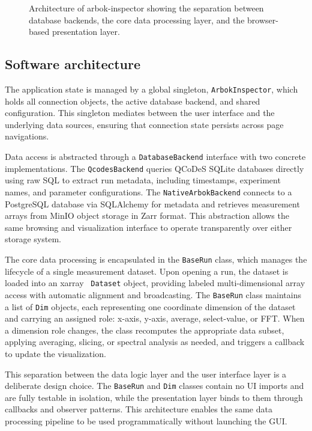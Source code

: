 \begin{figure}[H]
\caption{Architecture of arbok-inspector showing the separation between database backends, the core data processing layer, and the browser-based presentation layer.}
\label{fig:inspector_architecture}
\end{figure}

\subsection{Software architecture}

The application state is managed by a global singleton, \texttt{ArbokInspector}, which holds all connection objects, the active database backend, and shared configuration.
This singleton mediates between the user interface and the underlying data sources, ensuring that connection state persists across page navigations.

Data access is abstracted through a \texttt{DatabaseBackend} interface with two concrete implementations.
The \texttt{QcodesBackend} queries QCoDeS SQLite databases directly using raw SQL to extract run metadata, including timestamps, experiment names, and parameter configurations.
The \texttt{NativeArbokBackend} connects to a PostgreSQL database via SQLAlchemy for metadata and retrieves measurement arrays from MinIO object storage in Zarr format.
This abstraction allows the same browsing and visualization interface to operate transparently over either storage system.

The core data processing is encapsulated in the \texttt{BaseRun} class, which manages the lifecycle of a single measurement dataset.
Upon opening a run, the dataset is loaded into an xarray~\cite{xarray} \texttt{Dataset} object, providing labeled multi-dimensional array access with automatic alignment and broadcasting.
The \texttt{BaseRun} class maintains a list of \texttt{Dim} objects, each representing one coordinate dimension of the dataset and carrying an assigned role: x-axis, y-axis, average, select-value, or FFT.
When a dimension role changes, the class recomputes the appropriate data subset, applying averaging, slicing, or spectral analysis as needed, and triggers a callback to update the visualization.

This separation between the data logic layer and the user interface layer is a deliberate design choice.
The \texttt{BaseRun} and \texttt{Dim} classes contain no UI imports and are fully testable in isolation, while the presentation layer binds to them through callbacks and observer patterns.
This architecture enables the same data processing pipeline to be used programmatically without launching the GUI.

